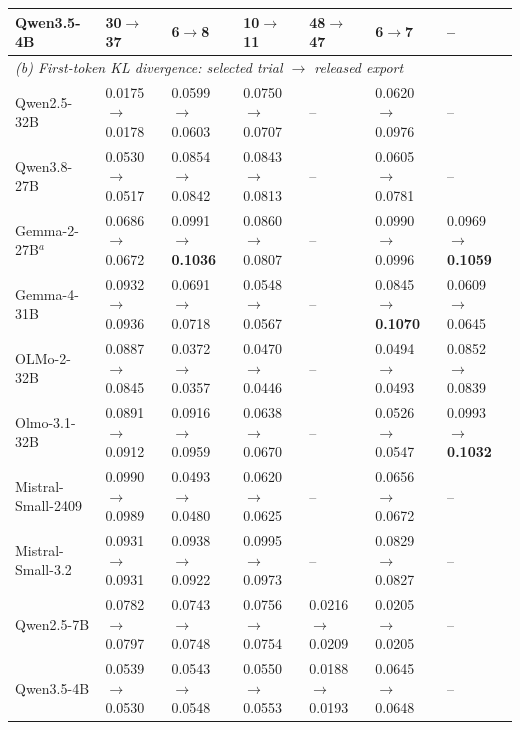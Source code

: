 \begin{table}[t]
\begin{tabular}{lllllll}
Qwen3.5-4B & 30$\to$\textbf{37} & 6$\to$8 & 10$\to$11 & 48$\to$47 & 6$\to$7 & -- \\
\midrule
\multicolumn{7}{l}{\emph{(b) First-token KL divergence: selected trial $\to$ released export}} \\
\addlinespace[2pt]
Qwen2.5-32B & 0.0175$\to$0.0178 & 0.0599$\to$0.0603 & 0.0750$\to$0.0707 & -- & 0.0620$\to$0.0976 & -- \\
Qwen3.8-27B & 0.0530$\to$0.0517 & 0.0854$\to$0.0842 & 0.0843$\to$0.0813 & -- & 0.0605$\to$0.0781 & -- \\
\addlinespace[2pt]
Gemma-2-27B$^{a}$ & 0.0686$\to$0.0672 & 0.0991$\to$\textbf{0.1036} & 0.0860$\to$0.0807 & -- & 0.0990$\to$0.0996 & 0.0969$\to$\textbf{0.1059} \\
Gemma-4-31B & 0.0932$\to$0.0936 & 0.0691$\to$0.0718 & 0.0548$\to$0.0567 & -- & 0.0845$\to$\textbf{0.1070} & 0.0609$\to$0.0645 \\
\addlinespace[2pt]
OLMo-2-32B & 0.0887$\to$0.0845 & 0.0372$\to$0.0357 & 0.0470$\to$0.0446 & -- & 0.0494$\to$0.0493 & 0.0852$\to$0.0839 \\
Olmo-3.1-32B & 0.0891$\to$0.0912 & 0.0916$\to$0.0959 & 0.0638$\to$0.0670 & -- & 0.0526$\to$0.0547 & 0.0993$\to$\textbf{0.1032} \\
\addlinespace[2pt]
Mistral-Small-2409 & 0.0990$\to$0.0989 & 0.0493$\to$0.0480 & 0.0620$\to$0.0625 & -- & 0.0656$\to$0.0672 & -- \\
Mistral-Small-3.2 & 0.0931$\to$0.0931 & 0.0938$\to$0.0922 & 0.0995$\to$0.0973 & -- & 0.0829$\to$0.0827 & -- \\
\addlinespace[2pt]
Qwen2.5-7B & 0.0782$\to$0.0797 & 0.0743$\to$0.0748 & 0.0756$\to$0.0754 & 0.0216$\to$0.0209 & 0.0205$\to$0.0205 & -- \\
Qwen3.5-4B & 0.0539$\to$0.0530 & 0.0543$\to$0.0548 & 0.0550$\to$0.0553 & 0.0188$\to$0.0193 & 0.0645$\to$0.0648 & -- \\
\bottomrule
\end{tabular}
\end{table}

